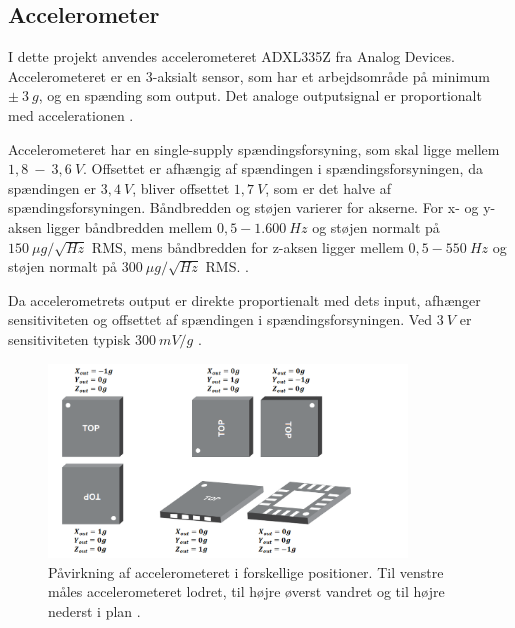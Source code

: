 \subsection{Accelerometer} \label{sec:acc}

I dette projekt anvendes accelerometeret ADXL335Z fra Analog Devices. Accelerometeret er en 3-aksialt sensor, som har et arbejdsområde på minimum $\pm~3~g$, og en spænding som output. Det analoge outputsignal er proportionalt med accelerationen \citep{analogdevices2009}. 

\noindent
Accelerometeret har en single-supply spændingsforsyning, som skal ligge mellem $1,8~-~3,6~V$.  Offsettet er afhængig af spændingen i spændingsforsyningen, da spændingen er $3,4~V$, bliver offsettet $1,7~V$, som er det halve af spændingsforsyningen. Båndbredden og støjen varierer for akserne. For x- og y-aksen ligger båndbredden mellem $0,5 - 1.600~Hz$ og støjen normalt på $150~\mu g/\sqrt{Hz}$ RMS, mens båndbredden for z-aksen ligger mellem $0,5 - 550~Hz$ og støjen normalt på $300~\mu g/\sqrt{Hz}$ RMS.  \citep{analogdevices2010}. 

Da accelerometrets output er direkte proportienalt med dets input, afhænger sensitiviteten og offsettet af spændingen i spændingsforsyningen. Ved $3~V$ er sensitiviteten typisk $300~mV/g$ \citep{analogdevices2010}. 


\begin{figure}[H]
\centering
\includegraphics[width=0.85\textwidth]{figures/acc_paavirkning}
\caption{Påvirkning af accelerometeret i forskellige positioner. Til venstre måles accelerometeret lodret, til højre øverst vandret og til højre nederst i plan \citep{analogdevices2010}.}
\label{fig:acc}
\end{figure}

